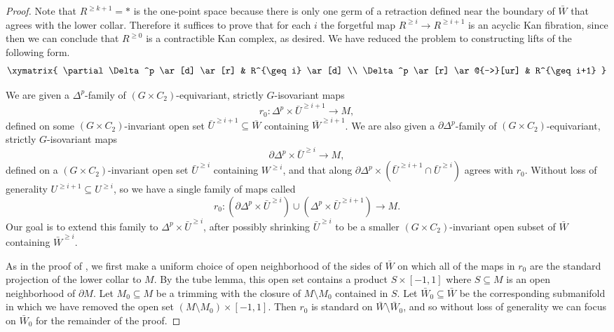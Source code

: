 \documentclass[11pt]{amsart}
\theoremstyle{definition}
\numberwithin{equation}{section}
\numberwithin{figure}{section}
\begin{document}
\begin{proof}
	Note that $R^{\geq k+1} = *$ is the one-point space because there is only one germ of a retraction defined near the boundary of $\bar W$ that agrees with the lower collar. Therefore it suffices to prove that for each $i$ the forgetful map $R^{\geq i} \to R^{\geq i+1}$ is an acyclic Kan fibration, since then we can conclude that $R^{\geq 0}$ is a contractible Kan complex, as desired. We have reduced the problem to constructing lifts of the following form.
	\begin{equation}\label{411_lift}
	\xymatrix{
		\partial \Delta^p \ar[d] \ar[r] & R^{\geq i} \ar[d] \\
		\Delta^p \ar[r] \ar@{-->}[ur] & R^{\geq i+1}
		}
	\end{equation}
	
	We are given a $\Delta^p$-family of $(G \times C_2)$-equivariant, strictly $G$-isovariant maps
	\[ r_0: \Delta^p \times \bar U^{\geq i+1} \to M, \]
	defined on some $(G \times C_2)$-invariant open set $\bar U^{\geq i+1} \subseteq \bar W$ containing $\bar W^{\geq i+1}$. We are also given a $\partial \Delta^p$-family of $(G \times C_2)$-equivariant, strictly $G$-isovariant maps
	\[ \partial \Delta^p \times \bar U^{\geq i} \to M, \]
	defined on a $(G \times C_2)$-invariant open set $\bar U^{\geq i}$ containing $W^{\geq i}$, and that along $\partial \Delta^p \times (\bar U^{\geq i+1} \cap \bar U^{\geq i})$ agrees with $r_0$. Without loss of generality $U^{\geq i+1} \subseteq U^{\geq i}$, so we have a single family of maps called
	\[ r_0\colon (\partial \Delta^p \times \bar U^{\geq i}) \cup (\Delta^p \times \bar U^{\geq i+1}) \to M. \]
	Our goal is to extend this family to $\Delta^p \times \bar U^{\geq i}$, after possibly shrinking $\bar U^{\geq i}$ to be a smaller $(G \times C_2)$-invariant open subset of $\bar W$ containing $\bar W^{\geq i}$.
	
	
	As in the proof of \cite[Prop 4.6]{GIMM1}, we first make a uniform choice of open neighborhood of the sides of $\bar W$ on which all of the maps in $r_0$ are the standard projection of the lower collar to $M$. By the tube lemma, this open set contains a product $S \times [-1,1]$ where $S \subseteq M$ is an open neighborhood of $\partial M$. Let $M_0 \subseteq M$ be a trimming with the closure of $M \setminus M_0$ contained in $S$. Let $\bar W_0 \subseteq \bar W$ be the corresponding submanifold in which we have removed the open set $(M \setminus M_0) \times [-1,1]$. Then $r_0$ is standard on $\bar W \setminus \bar W_0$, and so without loss of generality we can focus on $\bar W_0$ for the remainder of the proof.
	

\end{proof}
\end{document}
